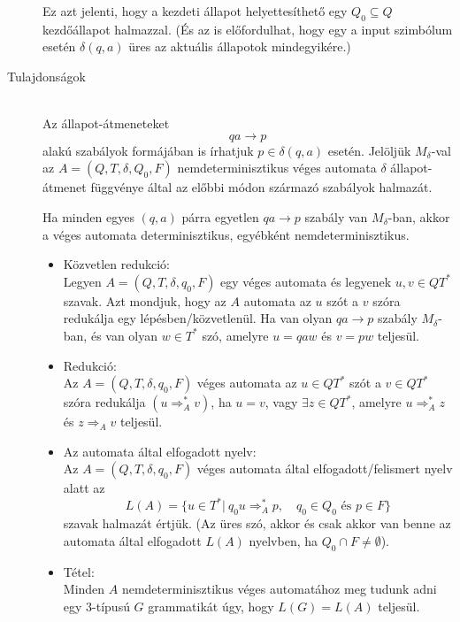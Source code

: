 \documentclass[margin=0px]{article}
\begin{document}
\begin{description}
					Ez azt jelenti, hogy a kezdeti állapot helyettesíthető egy $Q_0 \subseteq Q$ kezdőállapot halmazzal.
					(És az is előfordulhat, hogy egy a input szimbólum esetén $\delta(q, a)$ üres az aktuális állapotok mindegyikére.)
				\item[Tulajdonságok] \hfill \\
					Az állapot-átmeneteket
					\[qa \rightarrow p\]
					alakú szabályok formájában is írhatjuk $p \in \delta(q, a) $ esetén. Jelöljük $M_\delta$-val az $A = (Q, T, \delta,Q_0, F)$ nemdeterminisztikus véges automata $\delta$ állapot-átmenet függvénye által az előbbi módon származó szabályok halmazát.
					
					Ha minden egyes $(q, a)$ párra egyetlen $qa \rightarrow p$ szabály van $M_\delta$-ban, akkor a véges automata determinisztikus, egyébként nemdeterminisztikus.
					
					\begin{itemize}
						\item Közvetlen redukció: \\
							Legyen $A = (Q, T, \delta, q_0, F)$ egy véges automata és legyenek $u, v \in QT^*$ szavak. Azt mondjuk, hogy az $A$ automata az $u$ szót a $v$ szóra redukálja egy lépésben/közvetlenül. Ha van olyan $qa \rightarrow p$ szabály $M_\delta$-ban, és van olyan $w \in T^*$ szó, amelyre $u = qaw$ és $v = pw$ teljesül.
						
						\item Redukció:\\
							Az $A = (Q, T, \delta, q_0, F)$ véges automata az $u \in QT^*$ szót a $v \in QT^*$ szóra redukálja $(u \Longrightarrow_A^* v)$, ha $u = v$, vagy $ \exists z \in QT^*$, amelyre $u \Longrightarrow_A^* z$ és $z \Longrightarrow_A v$ teljesül.
					
						\item Az automata által elfogadott nyelv:\\
							Az $A = (Q, T, \delta, q_0, F)$ véges automata által elfogadott/felismert nyelv alatt az \[ L(A) = \{u \in T^* | \ q_0u \Longrightarrow_A^* p, \quad q_0 \in Q_0  \textrm{ és }  p \in F\} \] szavak halmazát értjük.  (Az üres szó, akkor és csak akkor van benne az automata által elfogadott $L(A)$ nyelvben, ha $Q_0 \cap F \neq \emptyset$).
						
						\item Tétel:\\
							Minden $A$ nemdeterminisztikus véges automatához meg tudunk adni egy 3-típusú $G$ grammatikát úgy, hogy $L(G) = L(A)$ teljesül.
						

\end{itemize}
\end{description}
\end{document}
